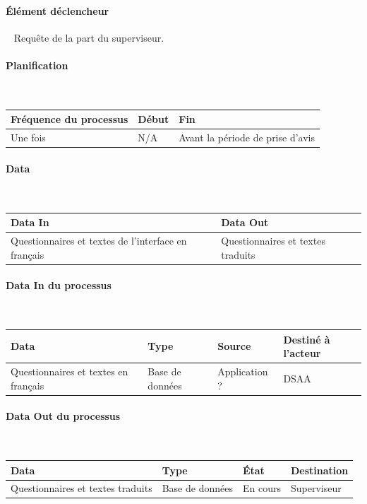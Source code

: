 \documentclass[a4paper,11pt]{report}
\begin{document}
\paragraph{Élément déclencheur}~\newline{}
Requête de la part du superviseur.

\paragraph{Planification}~\newline{}

\begin{tabularx}{\linewidth}{|X|X|X|} \hline
Fréquence du processus & Début & Fin \\ \hline
Une fois & N/A & Avant la période de prise d'avis \\ \hline
\end{tabularx}

\paragraph{Data}~\newline{}

\begin{tabularx}{\linewidth}{|X|X|} \hline
Data In & Data Out \\ \hline
Questionnaires et textes de l'interface en français & Questionnaires et textes traduits\\ \hline
\end{tabularx}

\paragraph{Data In du processus}~\newline{}

\begin{tabularx}{\linewidth}{|X|X|X|X|} \hline
Data & Type & Source & Destiné à l'acteur \\ \hline
Questionnaires et textes en français & Base de données & Application ? & DSAA\\ \hline
\end{tabularx}

\paragraph{Data Out du processus}~\newline{}

\begin{tabularx}{\linewidth}{|X|X|X|X|} \hline
Data & Type & État & Destination \\ \hline
Questionnaires et textes traduits & Base de données & En cours & Superviseur \\ \hline
\end{tabularx}
\end{document}
